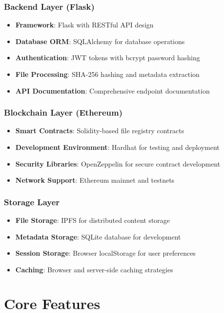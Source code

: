 \documentclass[11pt,a4paper]{article}
\begin{document}
\subsubsection{Backend Layer (Flask)}
\begin{itemize}
    \item \textbf{Framework}: Flask with RESTful API design
    \item \textbf{Database ORM}: SQLAlchemy for database operations
    \item \textbf{Authentication}: JWT tokens with bcrypt password hashing
    \item \textbf{File Processing}: SHA-256 hashing and metadata extraction
    \item \textbf{API Documentation}: Comprehensive endpoint documentation
\end{itemize}

\subsubsection{Blockchain Layer (Ethereum)}
\begin{itemize}
    \item \textbf{Smart Contracts}: Solidity-based file registry contracts
    \item \textbf{Development Environment}: Hardhat for testing and deployment
    \item \textbf{Security Libraries}: OpenZeppelin for secure contract development
    \item \textbf{Network Support}: Ethereum mainnet and testnets
\end{itemize}

\subsubsection{Storage Layer}
\begin{itemize}
    \item \textbf{File Storage}: IPFS for distributed content storage
    \item \textbf{Metadata Storage}: SQLite database for development
    \item \textbf{Session Storage}: Browser localStorage for user preferences
    \item \textbf{Caching}: Browser and server-side caching strategies
\end{itemize}

\section{Core Features}
\end{document}
